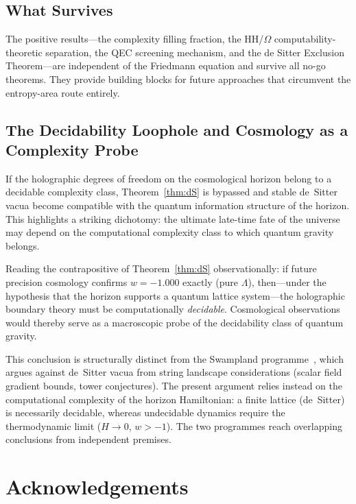 \documentclass[12pt,a4paper]{article}
\theoremstyle{remark}
\begin{document}
\subsection{What Survives}

The positive results---the complexity filling fraction, the HH/$\Omega$ computability-theoretic separation, the QEC screening mechanism, and the de Sitter Exclusion Theorem---are independent of the Friedmann equation and survive all no-go theorems.
They provide building blocks for future approaches that circumvent the entropy-area route entirely.

\subsection{The Decidability Loophole and Cosmology as a Complexity Probe}

If the holographic degrees of freedom on the cosmological horizon belong to a decidable complexity class, Theorem~\ref{thm:dS} is bypassed and stable de~Sitter vacua become compatible with the quantum information structure of the horizon.
This highlights a striking dichotomy: the ultimate late-time fate of the universe may depend on the computational complexity class to which quantum gravity belongs.

Reading the contrapositive of Theorem~\ref{thm:dS} observationally: if future precision cosmology confirms $w = -1.000$ exactly (pure $\Lambda$), then---under the hypothesis that the horizon supports a quantum lattice system---the holographic boundary theory must be computationally \emph{decidable}.
Cosmological observations would thereby serve as a macroscopic probe of the decidability class of quantum gravity.

This conclusion is structurally distinct from the Swampland programme~\cite{Vafa2005}, which argues against de~Sitter vacua from string landscape considerations (scalar field gradient bounds, tower conjectures).
The present argument relies instead on the computational complexity of the horizon Hamiltonian: a finite lattice (de~Sitter) is necessarily decidable, whereas undecidable dynamics require the thermodynamic limit ($H\to 0$, $w > -1$).
The two programmes reach overlapping conclusions from independent premises.


\section*{Acknowledgements}
\end{document}
